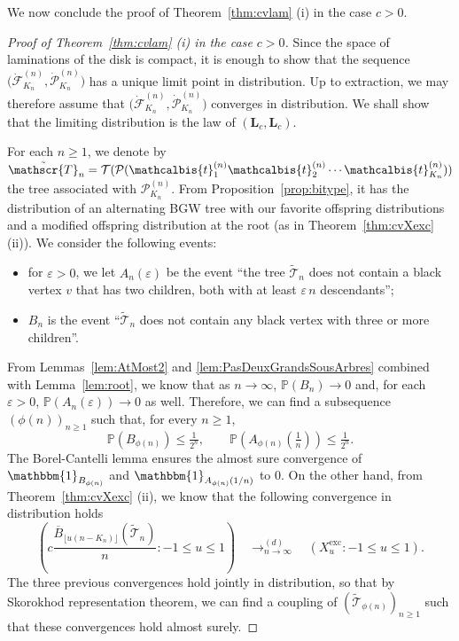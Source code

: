 \documentclass[10pt]{amsart}
\theoremstyle{definition}\newtheorem{defi}[theo]{Definition}\newtheorem{rema}[theo]{Remark}\newtheorem{exam}[theo]{Example}\newtheorem{exem}[theo]{Example}\newtheorem{nota}[theo]{Notation}
\def\eps{\varepsilon}
\def\PPP{\mathcal P}
\def\PKn{\mathcal{P}^{(n)}_{K_{n}}}
\def\dFKn{\dot{\mathcal{F}}^{(n)}_{K_{n}}}
\def\dPKn{\dot{\mathcal{P}}^{(n)}_{K_{n}}}
\def\oB{\overline{B}}
\def \Xexc{X^{\mathrm{exc}}}
\def\tTs{\tilde{\Ts}}
\def\tb{\mathcalbis{t}}
\def\Ts{\mathscr{T}}
\renewcommand{\epsilon}{\varepsilon}
\renewcommand\Pr[1]{\mathbb{P}\left(#1\right)}
\def\One{\mathbbm{1}}
\begin{document}
We now conclude the proof of Theorem~\ref{thm:cvlam} (i) in the case $c>0$.
\begin{proof}[Proof of Theorem~\ref{thm:cvlam} (i) in the case $c>0$]
  Since the space of laminations of the disk is compact,
  it is enough to show that the sequence $\big( \dFKn  ,  \dPKn \big) $ has a unique  limit point in distribution. Up to extraction, we may therefore assume that $\big( \dFKn  ,  \dPKn \big)$  converges in distribution. We shall show that the limiting distribution is the law of $(\mathbf{L}_c,\mathbf{L}_c)$.

  For each $n \ge 1$, we denote by $\tTs_n= \mathcal{T}( \PPP( \tb_{1}^{(n)} \tb_{2}^{(n)} \cdots \tb_{K_{n}}^{(n)}))$
  the tree associated with $\PKn$.
  From Proposition~\ref{prop:bitype}, it has the distribution of an alternating BGW tree with our favorite offspring distributions
  and a modified offspring distribution at the root (as in Theorem~\ref{thm:cvXexc} (ii)).
  We consider the following events:
  \begin{itemize}
    \item for $\epsilon >0$, we let $A_{n}(\epsilon)$ be the event ``the tree $\tTs_{n}$ does not contain a black
    vertex $v$ that has two children, both with at least $\eps \, n$ descendants'';
        \item $B_{n}$ is the event ``$\tTs_{n}$ does not contain any black vertex with three or more children''.
  \end{itemize}
  From Lemmas~\ref{lem:AtMost2} and \ref{lem:PasDeuxGrandsSousArbres} combined with Lemma~\ref{lem:root}, we know that
   as $n \rightarrow \infty$, $\Pr{B_{n}} \rightarrow 0$ and, for each $\eps >0$, $\Pr{A_{n}(\epsilon)} \rightarrow 0$ as well.
  Therefore, we can find a subsequence $(\phi(n))_{n \geq 1}$ such that, for every $n \geq 1$,
  \[ \Pr{{B_{\phi (n)}}} \leq \tfrac{1}{2^{n}}, \qquad \Pr{{A_{ \phi(n)} (\tfrac1n)}} \leq  \tfrac{1}{2^{n}}.\]
  The Borel-Cantelli lemma ensures the almost sure convergence of
  $\One_{B_{\phi (n)}}$ and $\One_{A_{ \phi(n)} (1/n)}$ to $0$.
  On the other hand, from Theorem~\ref{thm:cvXexc} (ii), we know that the following convergence in distribution holds
  \[  \left(  c \frac{\oB_{\lfloor u (n-K_{n}) \rfloor}(\tilde{\Ts}_{n})}{ n} : -1 \leq u \leq 1\right)  \quad \mathop{\longrightarrow}^{(d)}_{n \rightarrow \infty} \quad (\Xexc_{u}: -1 \leq u \leq 1).\]
  The three previous convergences hold jointly in distribution, so that by Skorokhod representation theorem,
  we can find a coupling of  $(\tTs_{\phi(n)})_{n \ge 1}$ such that these convergences hold almost surely.

\end{proof}
\end{document}
